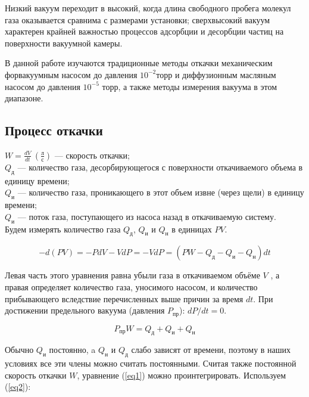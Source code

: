 \documentclass[a4paper,12pt]{article} %
\begin{document}
Низкий вакуум переходит в высокий, когда длина свободного пробега молекул газа оказывается сравнима с размерами установки; сверхвысокий вакуум характерен крайней важностью процессов адсорбции и десорбции частиц на поверхности вакуумной камеры.

В данной работе изучаются традиционные методы откачки механическим форвакуумным насосом до давления $10^{-2} $торр и диффузионным масляным насосом до давления $10^{-5}$ торр, а также методы измерения вакуума в этом диапазоне.

\subsection*{Процесс откачки}
\noindent $W = \frac{d V}{d t} \ (\frac{\text{л}}{\text{с}})$ — скорость откачки; \\
$Q_{\text{д}}$ — количество газа, десорбирующегося с поверхности откачиваемого объема в единицу времени; \\
$Q_{\text{и}}$ — количество газа, проникающего в этот объем извне (через щели) в единицу времени; \\
$Q_{\text{и}}$ — поток газа, поступающего из насоса назад в откачиваемую систему. \\

Будем измерять количество газа $Q_{\text{д}}$, $Q_{\text{и}}$ и $Q_{\text{н}}$ в единицах $PV$.

\begin{equation}
  - d(PV) = -PdV - V dP = -VdP = (P W - Q_{\text{д}} - Q_{\text{и}} - Q_{\text{н}})dt
  \label{eq1}
\end{equation}


Левая часть этого уравнения равна убыли газа в откачиваемом объёме $V$ , а правая определяет количество газа, уносимого насосом, и количество прибывающего вследствие перечисленных выше причин за время $dt$. При достижении предельного вакуума (давления $P_{\text{пр}}$): \( dP/dt = 0 \).

\begin{equation}
  P_{\text{пр}} W = Q_{\text{д}} + Q_{\text{и}} + Q_{\text{н}}
  \label{eq2}
\end{equation}

Обычно $Q_{\text{и}}$ постоянно, a $Q_{\text{н}}$ и $Q_{\text{д}}$ слабо зависят от времени, поэтому в наших условиях все эти члены можно считать постоянными. Считая также постоянной скорость откачки $W$, уравнение (\ref{eq1}) можно проинтегрировать. Используем (\ref{eq2}):
\end{document}
